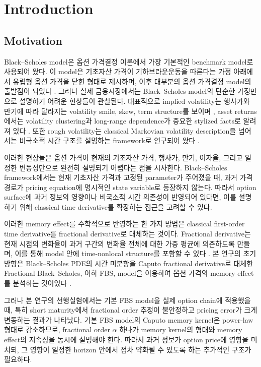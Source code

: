 \documentclass[11pt,a4paper]{report}
\begin{document}
\newpage
\tableofcontents

\chapter{Introduction}

\section{Motivation}

Black--Scholes model은 옵션 가격결정 이론에서 가장 기본적인 benchmark model로 사용되어 왔다.
이 model은 기초자산 가격이 기하브라운운동을 따른다는 가정 아래에서 유럽형 옵션 가격을
닫힌 형태로 제시하며, 이후 대부분의 옵션 가격결정 model의 출발점이 되었다 \cite{BlackScholes1973, Merton1973}.
그러나 실제 금융시장에서는 Black--Scholes model의 단순한 가정만으로 설명하기 어려운 현상들이 관찰된다.
대표적으로 implied volatility는 행사가와 만기에 따라 달라지는 volatility smile, skew, term structure를 보이며
\cite{Dupire1994}, asset returns에서는 volatility clustering과 long-range dependence가
중요한 stylized facts로 알려져 있다 \cite{Cont2001}.
또한 rough volatility는 classical Markovian volatility description을 넘어서는 비국소적 시간 구조를 설명하는 framework로 연구되어 왔다 \cite{GatheralJaissonRosenbaum2018}.

이러한 현상들은 옵션 가격이 현재의 기초자산 가격, 행사가, 만기, 이자율, 그리고 일정한 변동성만으로
완전히 설명되기 어렵다는 점을 시사한다.
Black--Scholes framework에서는 현재 기초자산 가격과 고정된 parameter가 주어졌을 때,
과거 가격 경로가 pricing equation에 명시적인 state variable로 등장하지 않는다.
따라서 option surface에 과거 정보의 영향이나 비국소적 시간 의존성이 반영되어 있다면,
이를 설명하기 위해 classical time derivative를 확장하는 접근을 고려할 수 있다.

이러한 memory effect를 수학적으로 반영하는 한 가지 방법은 classical first-order time derivative를
fractional derivative로 대체하는 것이다.
Fractional derivative는 현재 시점의 변화율이 과거 구간의 변화율 전체에 대한 가중 평균에 의존하도록 만들며,
이를 통해 model 안에 time-nonlocal structure를 포함할 수 있다 \cite{Podlubny1999}.
본 연구의 초기 방향은 Black--Scholes PDE의 시간 미분항을 Caputo fractional derivative로 대체한
Fractional Black--Scholes, 이하 FBS, model을 이용하여 옵션 가격의 memory effect를 분석하는 것이었다
\cite{Wyss2000, CarteaDelCastilloNegrete2007}.

그러나 본 연구의 선행실험에서는 기본 FBS model을 실제 option chain에 적용했을 때,
특히 short maturity에서 fractional order 추정이 불안정하고 pricing error가 크게 변동하는 결과가 나타났다.
기본 FBS model의 Caputo memory kernel은 power-law 형태로 감소하므로,
fractional order $\alpha$ 하나가 memory kernel의 형태와 memory effect의 지속성을 동시에 설명해야 한다.
따라서 과거 정보가 option price에 영향을 미치되,
그 영향이 일정한 horizon 안에서 점차 약화될 수 있도록 하는 추가적인 구조가 필요하다.
\end{document}
